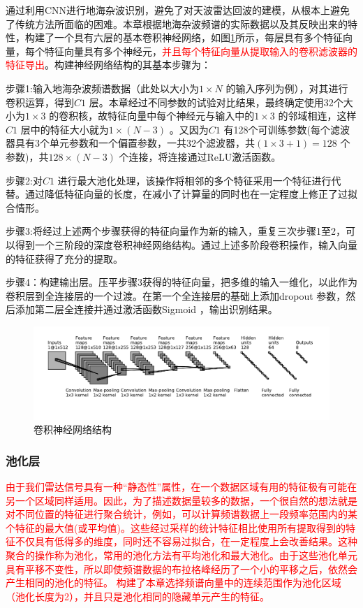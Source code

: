通过利用CNN进行地海杂波识别，避免了对天波雷达回波的建模，从根本上避免了传统方法所面临的困难。本章根据地海杂波频谱的实际数据以及其反映出来的特性，构建了一个具有六层的基本卷积神经网络，如图\ref{fig:struct}所示，每层具有多个特征向量，每个特征向量具有多个神经元，\textcolor{red}{并且每个特征向量从提取输入的卷积滤波器的特征导出}。构建神经网络结构的其基本步骤为：

步骤1:输入地海杂波频谱数据（此处以大小为$1\times N$ 的输入序列为例），对其进行卷积运算，得到$C1$ 层。本章经过不同参数的试验对比结果，最终确定使用32个大小为$1\times 3$ 的卷积核，故特征向量中每个神经元与输入中的$1\times 3$ 的邻域相连，这样$C1$ 层中的特征大小就为$1\times (N-3)$ 。又因为$C1$ 有128个可训练参数(每个滤波器具有3个单元参数和一个偏置参数，一共32个滤波器，共$(1\times 3 + 1) = 128$ 个参数)，共$128\times(N-3)$ 个连接，将连接通过ReLU激活函数。

步骤2:对$C1$ 进行最大池化处理，该操作将相邻的多个特征采用一个特征进行代替。通过降低特征向量的长度，在减小了计算量的同时也在一定程度上修正了过拟合情形。

步骤3:将经过上述两个步骤获得的特征向量作为新的输入，重复三次步骤1至2，可以得到一个三阶段的深度卷积神经网络结构。通过上述多阶段卷积操作，输入向量的特征获得了充分的提取。

步骤4：构建输出层。压平步骤3获得的特征向量，把多维的输入一维化，以此作为卷积层到全连接层的一个过渡。在第一个全连接层的基础上添加dropout 参数，然后添加第二层全连接并通过激活函数Sigmoid ，输出识别结果。

\begin{figure}[H]
	\centering
	\includegraphics[width=\textwidth]{figures/struct}
	\caption{卷积神经网络结构}
	\label{fig:struct}
\end{figure}

\subsubsection{池化层}
\textcolor{red}{由于我们雷达信号具有一种“静态性”属性，在一个数据区域有用的特征极有可能在另一个区域同样适用。因此，为了描述数据量较多的数据，一个很自然的想法就是对不同位置的特征进行聚合统计，例如，可以计算频谱数据上一段频率范围内的某个特征的最大值(或平均值)。这些经过采样的统计特征相比使用所有提取得到的特征不仅具有低得多的维度，同时还不容易过拟合，在一定程度上会改善结果。这种聚合的操作称为池化，常用的池化方法有平均池化和最大池化。由于这些池化单元具有平移不变性，所以即使频谱数据的布拉格峰经历了一个小的平移之后，依然会产生相同的池化的特征。
构建了本章选择频谱向量中的连续范围作为池化区域（池化长度为2），并且只是池化相同的隐藏单元产生的特征。
}

